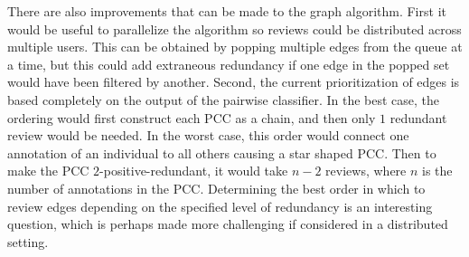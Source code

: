     There are also improvements that can be made to the graph algorithm.
    First it would be useful to parallelize the algorithm so reviews could be distributed across multiple users.
    This can be obtained by popping multiple edges from the queue at a time, but this could add extraneous
      redundancy if one edge in the popped set would have been filtered by another.
    Second, the current prioritization of edges is based completely on the output of the pairwise classifier.
    In the best case, the ordering would first construct each PCC as a chain, and then only $1$ redundant review
      would be needed.
    In the worst case, this order would connect one annotation of an individual to all others causing a star
      shaped PCC.
    Then to make the PCC $2$-positive-redundant, it would take $n - 2$ reviews, where $n$ is the number of
      annotations in the PCC.
    Determining the best order in which to review edges depending on the specified level of redundancy is an
      interesting question, which is perhaps made more challenging if considered in a distributed setting.


